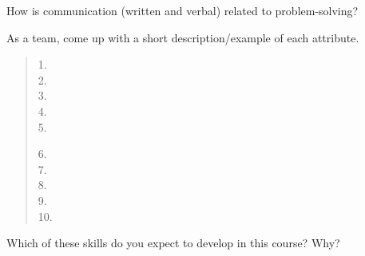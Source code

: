 \Q How is communication (written and verbal) related to problem-solving?

\begin{answer}[5em]
\end{answer}


\Q As a team, come up with a short description/example of each attribute.

\begin{quote}
\begin{minipage}{0.5\linewidth}
1.\\[1ex]
2.\\[1ex]
3.\\[1ex]
4.\\[1ex]
5.
\end{minipage}
\begin{minipage}{0.5\linewidth}
6.\\[1ex]
7.\\[1ex]
8.\\[1ex]
9.\\[1ex]
10.
\end{minipage}
\end{quote}

\Q Which of these skills do you expect to develop in this course? Why?

\begin{answer}
\end{answer}
